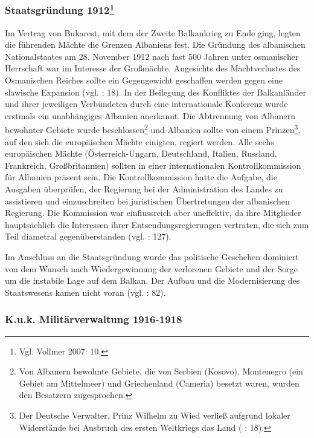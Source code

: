 \subsubsection[Staatsgründung 1912 ]{Staatsgründung 1912\footnote{Vgl. Vollmer 2007: 10.}}

Im Vertrag von Bukarest, mit dem der Zweite Balkankrieg zu Ende ging, legten die führenden Mächte die Grenzen Albaniens fest. Die Gründung des albanischen Nationalstaates am 28. November 1912 nach fast 500 Jahren unter osmanischer Herrschaft war im Interesse der Großmächte. Angesichts des Machtverlustes des Osmanischen Reiches sollte ein Gegengewicht geschaffen werden gegen eine slawische Expansion (vgl. \cite{biber} : 18). In der Beilegung des Konfliktes der Balkanländer und ihrer jeweiligen Verbündeten durch eine internationale Konferenz wurde erstmals ein unabhängiges Albanien anerkannt. Die Abtrennung von Albanern bewohnter Gebiete wurde beschlossen\footnote{Von Albanern bewohnte Gebiete, die von Serbien (Kosovo), Montenegro (ein Gebiet am Mittelmeer) und Griechenland (Cameria) besetzt waren, wurden den Besatzern zugesprochen.} und Albanien sollte von einem Prinzen\footnote{Der Deutsche Verwalter, Prinz Wilhelm zu Wied verließ aufgrund lokaler Widerstände bei Ausbruch des ersten Weltkriegs das Land (\cite{biber} : 18). }, auf den sich die europäischen Mächte einigten, regiert werden. Alle sechs europäischen Mächte (Österreich-Ungarn, Deutschland, Italien, Russland, Frankreich, Großbritannien) sollten in einer internationalen Kontrollkommission für Albanien präsent sein. Die Kontrollkommission hatte die Aufgabe, die Ausgaben überprüfen, der Regierung bei der Administration des Landes zu assistieren und einzuschreiten bei juristischen Übertretungen der albanischen Regierung. Die Kommission war einflussreich aber uneffektiv, da ihre Mitglieder hauptsächlich die Interessen ihrer Entsendungsregierungen vertraten, die sich zum Teil diametral gegenüberstanden (vgl. \cite{chek} : 127).\par
Im Anschluss an die Staatsgründung wurde das politische Geschehen dominiert von dem Wunsch nach Wiedergewinnung der verlorenen Gebiete und der Sorge um die instabile Lage auf dem Balkan. Der Aufbau und die Modernisierung des Staatswesens kamen nicht voran (vgl. \cite{hens99} : 82).
\subsubsection{K.u.k. Militärverwaltung 1916-1918}

